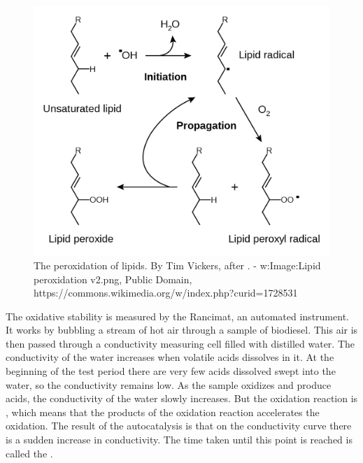 \begin{figure}
\centering
\includegraphics[width=\textwidth]{Figures/1281px-Lipid_peroxidation.svg.png}
\decoRule

\caption[The peroxidation of lipids.]{The peroxidation of lipids. By Tim
Vickers, after \autocite{Young2001}. - w:Image:Lipid peroxidation v2.png, Public
Domain, https://commons.wikimedia.org/w/index.php?curid=1728531}

\label{fig:RancidRadical}
\end{figure}



The oxidative stability is measured by the Rancimat, an automated instrument. It
works by bubbling a stream of hot air through a sample of biodiesel. This air is
then passed through a conductivity measuring cell filled with distilled water.
The conductivity of the water increases when volatile acids dissolves in it. At
the beginning of the test period there are very few acids dissolved swept into
the water, so the conductivity remains low. As the sample oxidizes and produce
acids, the conductivity of the water slowly increases. But the oxidation
reaction is , which means that the products of the
oxidation reaction accelerates the oxidation. The result of the autocatalysis is
that on the conductivity curve there is a sudden increase in conductivity. The
time taken until this point is reached is called the .

